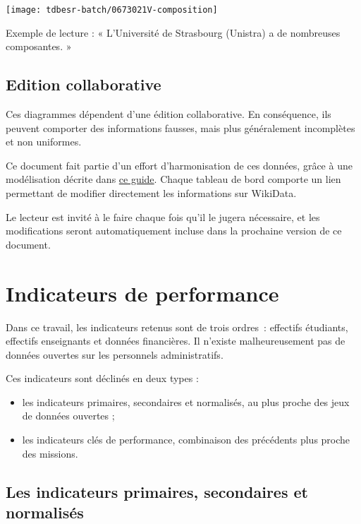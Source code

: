 \documentclass[12pt,french,landscape]{article}
\providecommand{\tightlist}{%
  \setlength{\itemsep}{0pt}\setlength{\parskip}{0pt}}
\begin{document}
\begin{multicols}{2}
\begin{center}\texttt{[image: tdbesr-batch/0673021V-composition]} \end{center}

Exemple de lecture : « L'Université de Strasbourg (Unistra) a de
nombreuses composantes. »

\hypertarget{edition-collaborative}{%
\subsection{Edition collaborative}\label{edition-collaborative}}

Ces diagrammes dépendent d'une édition collaborative. En conséquence,
ils peuvent comporter des informations fausses, mais plus généralement
incomplètes et non uniformes.

Ce document fait partie d'un effort d'harmonisation de ces données,
grâce à une modélisation décrite dans
\href{https://github.com/cpesr/wikidataESR/blob/master/Rmd/wikidataESR.md}{ce
guide}. Chaque tableau de bord comporte un lien permettant de modifier
directement les informations sur WikiData.

Le lecteur est invité à le faire chaque fois qu'il le jugera nécessaire,
et les modifications seront automatiquement incluse dans la prochaine
version de ce document.

\hypertarget{indicateurs-de-performance}{%
\section{Indicateurs de performance}\label{indicateurs-de-performance}}

Dans ce travail, les indicateurs retenus sont de trois ordres~:
effectifs étudiants, effectifs enseignants et données financières. Il
n'existe malheureusement pas de données ouvertes sur les personnels
administratifs.

Ces indicateurs sont déclinés en deux types :

\begin{itemize}
\tightlist
\item
  les indicateurs primaires, secondaires et normalisés, au plus proche
  des jeux de données ouvertes ;
\item
  les indicateurs clés de performance, combinaison des précédents plus
  proche des missions.
\end{itemize}

\hypertarget{les-indicateurs-primaires-secondaires-et-normalisuxe9s}{%
\subsection{Les indicateurs primaires, secondaires et
normalisés}\label{les-indicateurs-primaires-secondaires-et-normalisuxe9s}}


\end{multicols}
\end{document}
